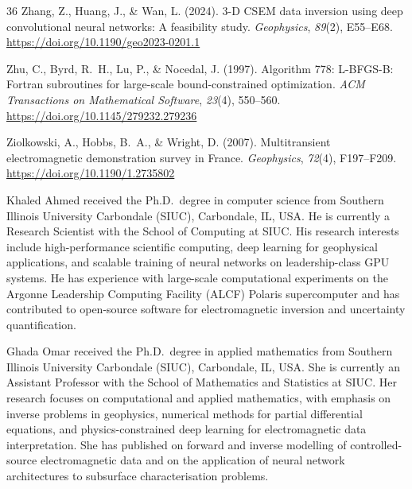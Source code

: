 \documentclass[journal]{IEEEtran}
\begin{document}
\begin{thebibliography}{36}
Zhang, Z., Huang, J., \& Wan, L. (2024).
3-D CSEM data inversion using deep convolutional neural networks:
A feasibility study.
\textit{Geophysics}, \textit{89}(2), E55--E68.
\url{https://doi.org/10.1190/geo2023-0201.1}

Zhu, C., Byrd, R.~H., Lu, P., \& Nocedal, J. (1997).
Algorithm 778: L-BFGS-B: Fortran subroutines for large-scale
bound-constrained optimization.
\textit{ACM Transactions on Mathematical Software}, \textit{23}(4),
550--560.
\url{https://doi.org/10.1145/279232.279236}

Ziolkowski, A., Hobbs, B.~A., \& Wright, D. (2007).
Multitransient electromagnetic demonstration survey in France.
\textit{Geophysics}, \textit{72}(4), F197--F209.
\url{https://doi.org/10.1190/1.2735802}

\end{thebibliography}

\begin{IEEEbiography}{Khaled Ahmed}
received the Ph.D.\ degree in computer science from Southern Illinois
University Carbondale (SIUC), Carbondale, IL, USA.  He is currently a
Research Scientist with the School of Computing at SIUC.  His research
interests include high-performance scientific computing, deep learning
for geophysical applications, and scalable training of neural networks
on leadership-class GPU systems.  He has experience with large-scale
computational experiments on the Argonne Leadership Computing Facility
(ALCF) Polaris supercomputer and has contributed to open-source
software for electromagnetic inversion and uncertainty quantification.
\end{IEEEbiography}

\begin{IEEEbiography}{Ghada Omar}
received the Ph.D.\ degree in applied mathematics from Southern
Illinois University Carbondale (SIUC), Carbondale, IL, USA.  She is
currently an Assistant Professor with the School of Mathematics and
Statistics at SIUC.  Her research focuses on computational and
applied mathematics, with emphasis on inverse problems in geophysics,
numerical methods for partial differential equations, and
physics-constrained deep learning for electromagnetic data
interpretation.  She has published on forward and inverse modelling
of controlled-source electromagnetic data and on the application of
neural network architectures to subsurface characterisation problems.
\end{IEEEbiography}
\end{document}
